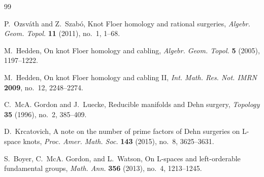 \documentclass[11pt]{article}
\begin{document}
\begin{thebibliography}{99}

P.~Ozsváth and Z.~Szabó,
\newblock Knot Floer homology and rational surgeries,
\newblock \emph{Algebr. Geom. Topol.} \textbf{11} (2011), no.~1, 1--68.

M.~Hedden,
\newblock On knot Floer homology and cabling,
\newblock \emph{Algebr. Geom. Topol.} \textbf{5} (2005), 1197--1222.

M.~Hedden,
\newblock On knot Floer homology and cabling II,
\newblock \emph{Int. Math. Res. Not. IMRN} \textbf{2009}, no.~12, 2248--2274.

C.~McA. Gordon and J.~Luecke,
\newblock Reducible manifolds and Dehn surgery,
\newblock \emph{Topology} \textbf{35} (1996), no.~2, 385--409.

D.~Krcatovich,
\newblock A note on the number of prime factors of Dehn surgeries on L-space knots,
\newblock \emph{Proc. Amer. Math. Soc.} \textbf{143} (2015), no.~8, 3625--3631.

S.~Boyer, C.~McA. Gordon, and L.~Watson,
\newblock On L-spaces and left-orderable fundamental groups,
\newblock \emph{Math. Ann.} \textbf{356} (2013), no.~4, 1213--1245.

\end{thebibliography}
\end{document}
